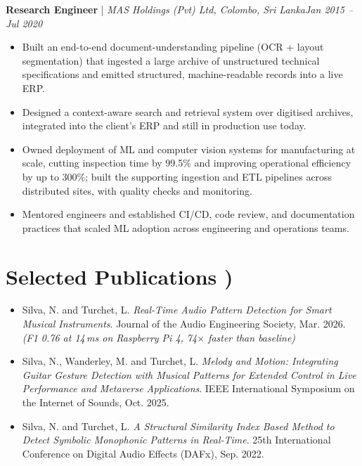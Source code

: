 \documentclass[11pt]{article}
\newenvironment{cvrole}[5]{%
  \par\noindent\textbf{#1} | \textit{\small #2, #3}\hfill \textit{\small #4 -- #5}\par
  \begin{itemize}[leftmargin=1.4em, itemsep=-0.3em, topsep=-0.15em]%
}{%
  \end{itemize}\par\noindent\mbox{}\par\vspace{-0.55em}%
}
\begin{document}
\begin{cvrole}{Research Engineer}{MAS Holdings (Pvt) Ltd}{Colombo, Sri Lanka}{Jan 2015}{Jul 2020}
    \item Built an end-to-end document-understanding pipeline (OCR + layout segmentation) that ingested a large archive of unstructured technical specifications and emitted structured, machine-readable records into a live ERP.
    \item Designed a context-aware search and retrieval system over digitised archives, integrated into the client's ERP and still in production use today.
    \item Owned deployment of ML and computer vision systems for manufacturing at scale, cutting inspection time by 99.5\% and improving operational efficiency by up to 300\%; built the supporting ingestion and ETL pipelines across distributed sites, with quality checks and monitoring.
    \item Mentored engineers and established CI/CD, code review, and documentation practices that scaled ML adoption across engineering and operations teams.
\end{cvrole}

\section*{Selected Publications \footnotesize {)}}
\begin{itemize}[leftmargin=1.2em, itemsep=-0.3em, topsep=0em]
    \item Silva, N. and Turchet, L. \textit{Real-Time Audio Pattern Detection for Smart Musical Instruments}. Journal of the Audio Engineering Society, Mar. 2026. \textit{(F1 0.76 at 14\,ms on Raspberry Pi 4, 74$\times$ faster than baseline)}
    \item Silva, N., Wanderley, M. and Turchet, L. \textit{Melody and Motion: Integrating Guitar Gesture Detection with Musical Patterns for Extended Control in Live Performance and Metaverse Applications}. IEEE International Symposium on the Internet of Sounds, Oct. 2025.
    \item Silva, N. and Turchet, L. \textit{A Structural Similarity Index Based Method to Detect Symbolic Monophonic Patterns in Real-Time}. 25th International Conference on Digital Audio Effects (DAFx), Sep. 2022.
\end{itemize}
\end{document}
